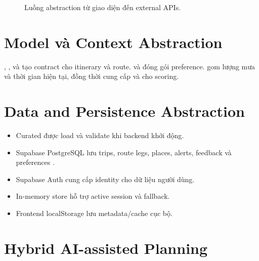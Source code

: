 \begin{figure}[H]
\centering
{}
\caption{Luồng abstraction từ giao diện đến external APIs.}
\label{fig:abstraction-layers}
\end{figure}

\section{Model và Context Abstraction}

, ,  và  tạo contract cho itinerary và route.  và  đóng gói preference.  gom lượng mưa và thời gian hiện tại, đồng thời cung cấp  và  cho scoring.

\section{Data and Persistence Abstraction}

\begin{itemize}
  \item Curated  được load và validate khi backend khởi động.
  \item Supabase PostgreSQL lưu trips, route legs, places, alerts, feedback và preferences \cite{supabase}.
  \item Supabase Auth cung cấp identity cho dữ liệu người dùng.
  \item In-memory store hỗ trợ active session và fallback.
  \item Frontend localStorage lưu metadata/cache cục bộ.
\end{itemize}

\section{Hybrid AI-assisted Planning}


